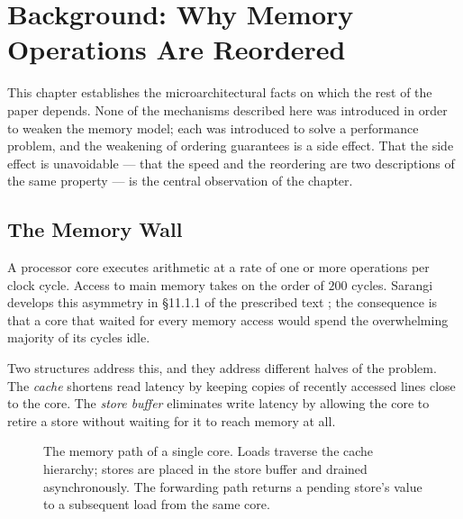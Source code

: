 \chapter{Background: Why Memory Operations Are Reordered}
\label{ch:background}

This chapter establishes the microarchitectural facts on which the rest of the
paper depends.
None of the mechanisms described here was introduced in order to
weaken the memory model; each was introduced to solve a performance problem, and
the weakening of ordering guarantees is a side effect.
That the side effect is
unavoidable --- that the speed and the reordering are two descriptions of the same
property --- is the central observation of the chapter.

\section{The Memory Wall}
\label{sec:memwall}

A processor core executes arithmetic at a rate of one or more operations per
clock cycle.
Access to main memory takes on the order of $200$ cycles.
Sarangi
develops this asymmetry in \S11.1.1 of the prescribed text
\cite{sarangi2025basic}; the consequence is that a core that waited for every
memory access would spend the overwhelming majority of its cycles idle.

Two structures address this, and they address different halves of the problem.
The \emph{cache} shortens read latency by keeping copies of recently accessed
lines close to the core.
The \emph{store buffer} eliminates write latency by
allowing the core to retire a store without waiting for it to reach memory at all.

\begin{figure}[H]
\centering
{}
\caption{The memory path of a single core. Loads traverse the cache hierarchy;
stores are placed in the store buffer and drained asynchronously. The forwarding
path returns a pending store's value to a subsequent load from the same core.}
\label{fig:hierarchy}
\end{figure}

